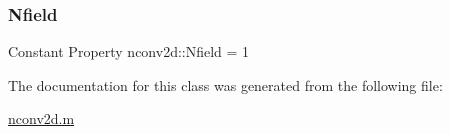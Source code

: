 \mbox{\label{classnconv2d_a76d4b7f5283e5965bcda339d915bbce9}} 
\subsubsection{\texorpdfstring{Nfield}{Nfield}}
{\footnotesize\ttfamily Constant Property nconv2d\+::\+Nfield = 1}



The documentation for this class was generated from the following file\+:\begin{DoxyCompactItemize}
\item 
\hyperlink{nconv2d_8m}{nconv2d.\+m}\end{DoxyCompactItemize}
